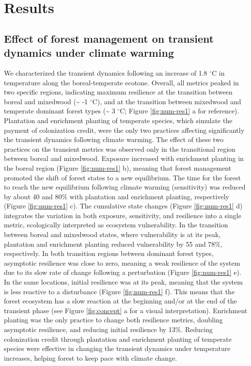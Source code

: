 \hypertarget{results}{%
\section{Results}\label{results}}

\hypertarget{effect-of-forest-management-on-transient-dynamics-under-climate-warming}{%
\subsection{Effect of forest management on transient dynamics under
climate
warming}\label{effect-of-forest-management-on-transient-dynamics-under-climate-warming}}

We characterized the transient dynamics following an increase of 1.8
\(^{\circ}\)C in temperature along the boreal-temperate ecotone.
Overall, all metrics peaked in two specific regions, indicating maximum
resilience at the transition between boreal and mixedwood
(\textasciitilde{} -1 \(^{\circ}\)C), and at the transition between
mixedwood and temperate dominant forest types (\textasciitilde{} 3
\(^{\circ}\)C; Figure \ref{fig:num-res1} a for reference). Plantation
and enrichment planting of temperate species, which simulate the payment
of colonization credit, were the only two practices affecting
significantly the transient dynamics following climate warming. The
effect of these two practices on the transient metrics was observed only
in the transitional region between boreal and mixedwood. Exposure
increased with enrichment planting in the boreal region (Figure
\ref{fig:num-res1} b), meaning that forest management promoted the shift
of forest states to a new equilibrium. The time for the forest to reach
the new equilibrium following climate warming (sensitivity) was reduced
by about 40 and 80\% with plantation and enrichment planting,
respectively (Figure \ref{fig:num-res1} c). The cumulative state changes
(Figure \ref{fig:num-res1} d) integrates the variation in both exposure,
sensitivity, and resilience into a single metric, ecologically
interpreted as ecosystem vulnerability. In the transition between boreal
and mixedwood states, where vulnerability is at its peak, plantation and
enrichment planting reduced vulnerability by 55 and 78\%, respectively.
In both transition regions between dominant forest types, asymptotic
resilience was close to zero, meaning a weak resilience of the system
due to its slow rate of change following a perturbation (Figure
\ref{fig:num-res1} e). In the same locations, initial resilience was at
its peak, meaning that the system is less reactive to a disturbance
(Figure \ref{fig:num-res1} f). This means that the forest ecosystem has
a slow reaction at the beginning and/or at the end of the transient
phase (see Figure \ref{fig:concept} a for a visual interpretation).
Enrichment planting was the only practice to change both resilience
metrics, doubling asymptotic resilience, and reducing initial resilience
by 13\%. Reducing colonization credit through plantation and enrichment
planting of temperate species were effective in changing the transient
dynamics under temperature increases, helping forest to keep pace with
climate change.\\

